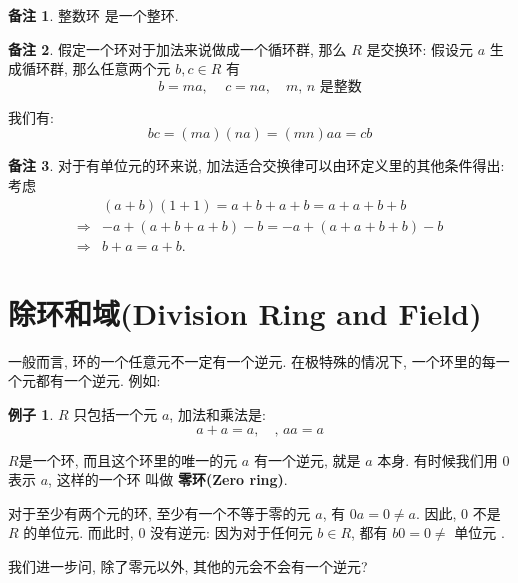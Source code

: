 \documentclass[utf8]{ctexbook}
\theoremstyle{definition}
\newtheorem{memo}{备注}[section]
\newtheorem{example}{例子}[section]
\begin{document}
\begin{memo}
整数环 是一个整环. 
\end{memo}

\begin{memo}
假定一个环对于加法来说做成一个循环群, 那么 $R$ 是交换环: 假设元 $a$ 生成循环群, 那么任意两个元 $b, c \in R$ 有
\begin{equation}
b = ma, \quad \, c = n a, \quad m, \, n \mbox{ 是整数}
\end{equation}  

我们有:
\begin{equation}
bc = (ma ) (na) = (mn) a a = c b
\end{equation}

\end{memo}


\begin{memo}
对于有单位元的环来说, 加法适合交换律可以由环定义里的其他条件得出: 考虑
\begin{align*}
 & (a+b) (1+1) = a+b+a+b = a+a+b+b  \\
 \Rightarrow & -a + (a+b+a+b) - b = -a + (a+a+b+b ) -b \\
 \Rightarrow & b+a = a + b   .
\end{align*}

\end{memo}

\section{除环和域(Division Ring and Field)}

一般而言, 环的一个任意元不一定有一个逆元. 在极特殊的情况下, 一个环里的每一个元都有一个逆元. 例如:

\begin{example}
$R$ 只包括一个元 $a$, 加法和乘法是:
\begin{equation}
a + a = a, \quad, \, a a = a
\end{equation}

$R$是一个环, 而且这个环里的唯一的元 $a$ 有一个逆元, 就是 $a$ 本身. 有时候我们用 $0$ 表示 $a$, 这样的一个环 叫做 \textbf{零环(Zero ring)}.

\end{example}


对于至少有两个元的环, 至少有一个不等于零的元 $a$, 有 $0 a = 0 \neq a$. 因此, $0$ 不是 $R$ 的单位元. 而此时, $0$ 没有逆元: 因为对于任何元 $b \in R$, 都有 $b0 =  0 \neq \mbox{ 单位元 }$.

我们进一步问, 除了零元以外, 其他的元会不会有一个逆元? 
\end{document}
